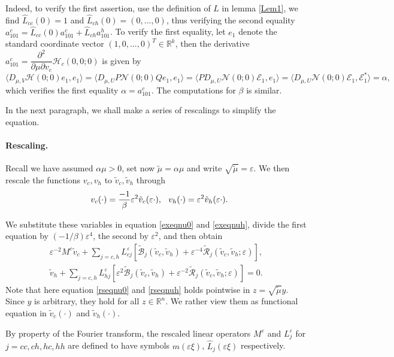 \documentclass[10pt]{article}
\newcommand{\R}{\mathbb{R}}
\newcommand{\eps}{\varepsilon}
\newcommand{\Nl}{\mathcal{N}}
\newcommand{\B}{\mathcal{B}}
\newcommand{\Rm}{\mathcal{R}}
\begin{document}
Indeed, to verify the first assertion, use the definition of $L$ in lemma \ref{Lem1}, we find $\widehat{L}_{cc}(0)=1$ and $\widehat{L}_{ch}(0)=(0,\ldots,0)$, thus verifying the second equality $a_{101}^c=\widehat{L}_{cc}(0)a_{101}^c+\widehat{L}_{ch}a_{101}^h$. 
To verify the first equality, let $e_1$ denote the standard coordinate vector $(1,0,\ldots,0)^T \in \R^k$, then the derivative 
$a_{101}^c=\dfrac{\partial^2}{\partial \mu \partial v_c}  \mathcal{H}_c(0,0;0)$ is given by
\[
\langle D_{\mu,V}\mathcal{H}(0;0)e_1,e_1\rangle=\langle D_{\mu,U} P\Nl(0;0)Q e_1,e_1\rangle = \langle PD_{\mu,U}\Nl(0;0) \mathcal{E}_1,e_1\rangle  = \langle D_{\mu,U}\Nl(0;0)\mathcal{E}_1,\mathcal{E}_1^*\rangle = \alpha,
\]
which verifies the first equality $\alpha=a_{101}^c$. The computations for $\beta$ is similar.

In the next paragraph, we shall make a series of rescalings to simplify the equation.

\paragraph{Rescaling.} Recall we have assumed $\alpha \mu > 0$, set now $\tilde{\mu} = \alpha \mu$ and write $\sqrt{\tilde{\mu}} = \eps$. We then rescale the functions $v_c, v_h$ to $\tilde{v}_c,\tilde{v}_h$ through 
\[
\hspace{0.1in} v_c(\cdot)=\frac{-1}{\beta}\eps^2\tilde{v}_c(\eps \cdot), \hspace{0.1in} v_h(\cdot)=\eps^2 \tilde{v}_h(\eps \cdot).
\]


We substitute these variables in equation \eqref{exeqnu0} and \eqref{exeqnuh}, divide the first equation by $(-1/\beta)\eps^4$, the second by $\eps^2$, and then obtain
\begin{align}
\eps^{-2}M^\eps \tilde{v}_c + \sum_{j=c,h} L_{cj}^{\eps}[\tilde{\B}_j(\tilde{v}_c,\tilde{v}_h)+\eps^{-4}\tilde{\Rm}_j(\tilde{v}_c,\tilde{v}_h;\eps)],\label{rseqnu0}\\
\tilde{v}_h +\sum_{j=c,h} L_{hj}^{\eps}[\eps^2\tilde{\B}_j(\tilde{v}_c,\tilde{v}_h)+\eps^{-2}\tilde{\Rm}_j(\tilde{v}_c,\tilde{v}_h;\eps)] = 0. \label{rseqnuh}
\end{align}
Note that here equation \eqref{rseqnu0} and \eqref{rseqnuh} holds pointwise in $z = \sqrt{\tilde{\mu}} y$. Since $y$ is arbitrary, they hold for all $z \in \R^n$. We rather view them as functional equation in $\tilde{v}_c(\cdot)$ and $\tilde{v}_h(\cdot)$.

By property of the Fourier transform, the rescaled linear operators $M^\eps $ and $L^\eps_j$ for $j = cc,ch,hc,hh$ are defined to have symbols $m(\eps \xi)$, $\widehat{L}_j(\eps \xi)$ respectively. 
\end{document}
